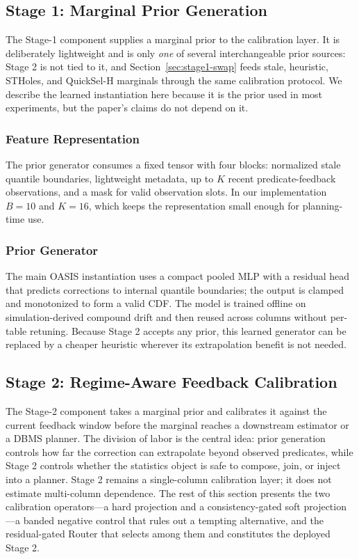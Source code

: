 \documentclass[preprint,12pt]{elsarticle}
\begin{document}
\subsection{Stage 1: Marginal Prior Generation}
\label{sec:stage1}

The Stage-1 component supplies a marginal prior to the calibration layer. It is
deliberately lightweight and is only \emph{one} of several interchangeable prior
sources: Stage 2 is not tied to it, and Section~\ref{sec:stage1-swap} feeds
stale, heuristic, STHoles, and QuickSel-H marginals through the same calibration
protocol. We describe the learned instantiation here because it is the prior used
in most experiments, but the paper's claims do not depend on it.

\subsubsection{Feature Representation}

The prior generator consumes a fixed tensor with four blocks: normalized stale
quantile boundaries, lightweight metadata, up to $K$ recent predicate-feedback
observations, and a mask for valid observation slots. In our implementation
$B=10$ and $K=16$, which keeps the representation small enough for
planning-time use.

\subsubsection{Prior Generator}

The main OASIS instantiation uses a compact pooled MLP with a residual head that
predicts corrections to internal quantile boundaries; the output is clamped and
monotonized to form a valid CDF. The model is trained offline on
simulation-derived compound drift and then reused across columns without
per-table retuning. Because Stage 2 accepts any prior, this learned generator can
be replaced by a cheaper heuristic wherever its extrapolation benefit is not
needed.

\subsection{Stage 2: Regime-Aware Feedback Calibration}
\label{sec:oasis-proj}

The Stage-2 component takes a marginal prior and calibrates it against the
current feedback window before the marginal reaches a downstream estimator or a
DBMS planner. The division of labor is the central idea: prior generation
controls how far the correction can extrapolate beyond observed predicates, while
Stage 2 controls whether the statistics object is safe to compose, join, or
inject into a planner. Stage 2 remains a single-column calibration layer; it does
not estimate multi-column dependence. The rest of this section presents the two
calibration operators---a hard projection and a consistency-gated soft
projection---a banded negative control that rules out a tempting alternative, and
the residual-gated Router that selects among them and constitutes the deployed
Stage 2.
\end{document}
